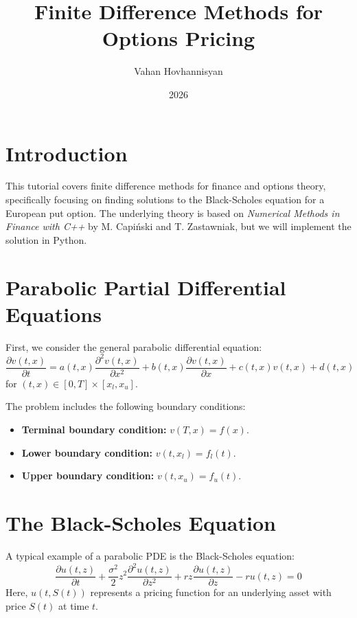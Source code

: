\documentclass{article}
\title{Finite Difference Methods for Options Pricing}
\author{Vahan Hovhannisyan}
\date{2026}
\begin{document}
\maketitle

\section{Introduction}
This tutorial covers finite difference methods for finance and options theory, specifically focusing on finding solutions to the Black-Scholes equation for a European put option. The underlying theory is based on \textit{Numerical Methods in Finance with C++} by M. Capi\'{n}ski and T. Zastawniak, but we will implement the solution in Python.

\section{Parabolic Partial Differential Equations}
First, we consider the general parabolic differential equation:
\begin{equation} \label{eq:parabolic}
\frac{\partial v(t,x)}{\partial t} = a(t,x) \frac{\partial^2 v(t,x)}{\partial x^2} + b(t,x)\frac{\partial v(t,x)}{\partial x} + c(t,x)v(t,x) + d(t,x)
\end{equation}
for $(t,x)\in [0,T]\times [x_l,x_u]$.

The problem includes the following boundary conditions:
\begin{itemize}
    \item \textbf{Terminal boundary condition:} $v(T,x) = f(x)$.
    \item \textbf{Lower boundary condition:} $v(t,x_l) = f_l(t)$.
    \item \textbf{Upper boundary condition:} $v(t,x_u) = f_u(t)$.
\end{itemize}

\section{The Black-Scholes Equation}
A typical example of a parabolic PDE is the Black-Scholes equation:
\begin{equation} \label{eq:black-scholes}
\frac{\partial u(t,z)}{\partial t} + \frac{\sigma^2}{2}z^2\frac{\partial^2 u(t,z)}{\partial z^2} + rz\frac{\partial u(t,z)}{\partial z} - r u(t,z) = 0
\end{equation}
Here, $u(t,S(t))$ represents a pricing function for an underlying asset with price $S(t)$ at time $t$.
\end{document}
